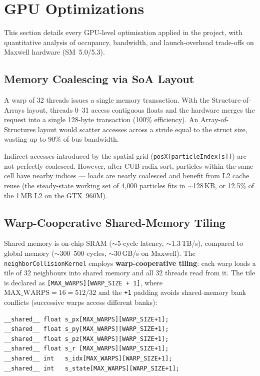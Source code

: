 \section{GPU Optimizations}
\label{sec:optimizations}

This section details every GPU-level optimisation applied in the project,
with quantitative analysis of occupancy, bandwidth, and launch-overhead
trade-offs on Maxwell hardware (SM~5.0/5.3).

\subsection{Memory Coalescing via SoA Layout}
\label{sec:soa}

A warp of 32 threads issues a single memory transaction. With the
Structure-of-Arrays layout, threads 0--31 access contiguous floats and the
hardware merges the request into a single 128-byte transaction (100\%
efficiency). An Array-of-Structures layout would scatter accesses across
a stride equal to the struct size, wasting up to 90\% of bus bandwidth.

Indirect accesses introduced by the spatial grid
(\texttt{posX[particleIndex[s]]}) are not perfectly coalesced. However, after
CUB radix sort, particles within the same cell have nearby indices ---
loads are nearly coalesced and benefit from L2 cache reuse (the steady-state
working set of 4{,}000 particles fits in $\sim$128\,KB, or 12.5\% of the 1\,MB
L2 on the GTX~960M).

\subsection{Warp-Cooperative Shared-Memory Tiling}
\label{sec:tiling}

Shared memory is on-chip SRAM ($\sim$5-cycle latency, $\sim$1.3\,TB/s), compared
to global memory ($\sim$300--500 cycles, $\sim$30\,GB/s on Maxwell). The
\texttt{neighborCollisionKernel} employs \textbf{warp-cooperative tiling}: each
warp loads a tile of 32 neighbours into shared memory and all 32 threads read
from it. The tile is declared as \texttt{[MAX\_WARPS][WARP\_SIZE + 1]}, where
$\text{MAX\_WARPS} = 16 = 512/32$ and the \texttt{+1} padding avoids
shared-memory bank conflicts (successive warps access different banks):

\begin{lstlisting}
__shared__ float s_px[MAX_WARPS][WARP_SIZE+1];
__shared__ float s_py[MAX_WARPS][WARP_SIZE+1];
__shared__ float s_pz[MAX_WARPS][WARP_SIZE+1];
__shared__ float s_r [MAX_WARPS][WARP_SIZE+1];
__shared__ int   s_idx[MAX_WARPS][WARP_SIZE+1];
__shared__ int   s_state[MAX_WARPS][WARP_SIZE+1];
\end{lstlisting}

